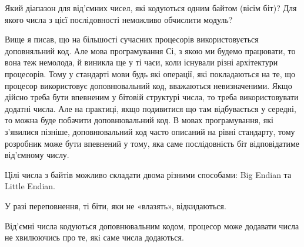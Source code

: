 \begin{exercise}
Який діапазон для від'ємних чисел, які кодуються одним байтом (вісім біт)?
Для якого числа з цієї послідовності неможливо обчислити модуль?
\end{exercise}

\medskip

Вище я писав, що на більшості сучасних процесорів використовується доповняльний код.
Але мова програмування Сі, з якою ми будемо працювати, то вона теж немолода, й виникла ще у ті часи, коли існували різні архітектури процесорів.
Тому у стандарті мови будь які операції, які покладаються на те, що процесор використовує доповнювальний код, вважаються невизначеними.
Якщо дійсно треба бути впевненим у бітовій структурі числа, то треба використовувати додатні числа.
Але на практиці, якщо подивитися що там відбувається у середні, то можна буде побачити доповнювальний код.
В мовах програмування, які з'явилися пізніше, доповнювальний код часто описаний на рівні стандарту, тому розробник може бути впевнений у тому, яка саме послідовність біт відповідатиме від'ємному числу.

\begin{summary}
\item Цілі числа з байтів можливо складати двома різними способами: Big Endian та Little Endian.
\item У разі переповнення, ті біти, яки не «влазять», відкидаються.
\item Від'ємні числа кодуються доповнювальним кодом, процесор може додавати числа не хвилюючись про те, якi саме числа додаються.
\end{summary}
